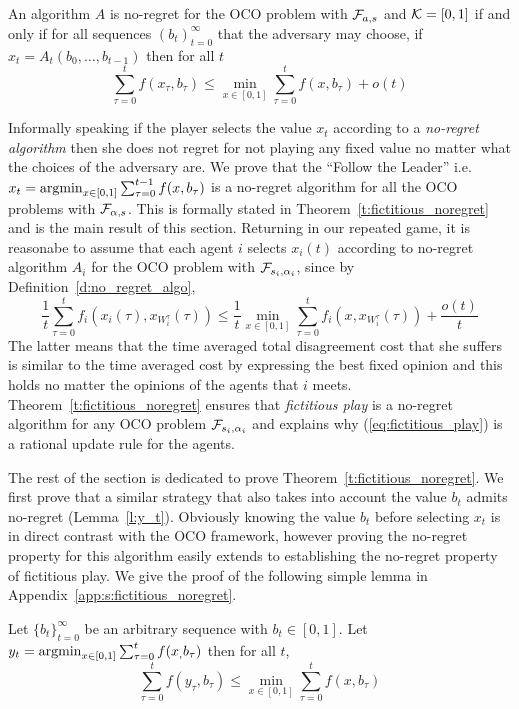 \begin{definition}\label{d:no_regret_algo}
An algorithm $A$ is no-regret for the OCO problem with $\mathcal{F}_{a,s}$ and
$\mathcal{K}=[0,1]$ if and only if for all sequences $(b_t)_{t=0}^\infty$ that the
adversary may choose, if $x_t = A_t(b_0,\dots,b_{t-1})$ then for all $t$
\[\sum_{\tau=0}^t f(x_\tau,b_\tau)  \leq \min_{x \in [0,1]}\sum_{\tau=0}^t f(x,b_\tau) + o(t) \]
\end{definition}
Informally speaking if the player selects the value
$x_t$ according to a \emph{no-regret algorithm} then
she does not regret for not playing any fixed value no
matter what the choices of the adversary are.
We prove that the \enquote{Follow the Leader} i.e.
$x_t = \operatorname*{argmin}_{x \in [0,1]}\sum_{\tau=0}^{t-1}f(x,b_\tau)$
is a no-regret algorithm for all the OCO problems with $\mathcal{F}_{\alpha,s}$.
This is formally stated in Theorem~\ref{t:fictitious_noregret}
and is the main result of this section.
Returning in our repeated game, it is reasonabe to
assume that each agent $i$ selects $x_i(t)$ according
to no-regret algorithm $A_i$ for the OCO problem with $\mathcal{F}_{s_i,\alpha_i}$,
since by Definition~\ref{d:no_regret_algo},
\[\frac{1}{t}\sum_{\tau=0}^t f_i(x_i(\tau),x_{W_i^\tau}(\tau)) \leq
\frac{1}{t}\min_{x \in [0,1]}\sum_{\tau=0}^tf_i(x,x_{W_i^\tau}(\tau)) + \frac{o(t)}{t}\]
The latter means that the time averaged total disagreement cost
that she suffers is similar to the time averaged cost by expressing the
best fixed opinion and this holds no matter the opinions of the
agents that $i$ meets. Theorem~\ref{t:fictitious_noregret}
ensures that \emph{fictitious play} is a no-regret algorithm
for any OCO problem $\mathcal{F}_{s_i,\alpha_i}$ and explains why
(\ref{eq:fictitious_play}) is a rational update rule for the agents.

The rest of the section is dedicated to prove Theorem~\ref{t:fictitious_noregret}.
We first prove that a similar strategy that also takes into
account the value $b_t$ admits no-regret (Lemma~\ref{l:y_t}).
Obviously knowing the value $b_t$ before selecting $x_t$
is in direct contrast with the OCO framework, however proving
the no-regret property for this algorithm easily extends to
establishing the no-regret property of fictitious play.
We give the proof of the following simple lemma in
Appendix~\ref{app:s:fictitious_noregret}.

\begin{lemma}\label{l:y_t}
Let $\{b_t\}_{t=0}^\infty$ be an arbitrary sequence with $b_t \in [0,1]$. Let $y_t = \operatorname*{argmin}_{x \in [0,1]}\sum_{\tau=0}^tf(x_,b_\tau)$
then for all $t$,
\[
\sum_{\tau=0}^t f(y_\tau,b_\tau) \leq \min_{x \in [0,1]}\sum_{\tau = 0}^tf(x,b_\tau)
\]
\end{lemma}

